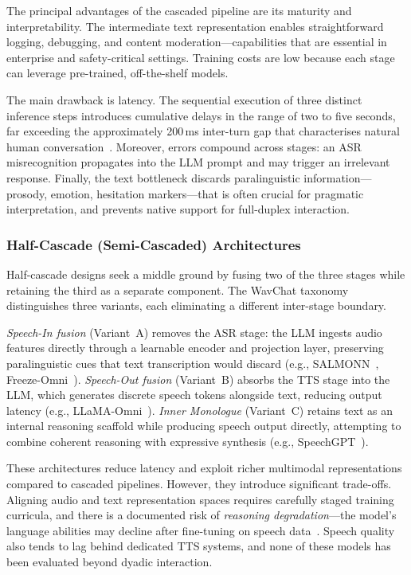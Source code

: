 The principal advantages of the cascaded pipeline are its maturity and
interpretability.  The intermediate text representation enables straightforward
logging, debugging, and content moderation---capabilities that are essential in
enterprise and safety-critical settings.  Training costs are low because each
stage can leverage pre-trained, off-the-shelf models.

The main drawback is latency.  The sequential execution of three distinct
inference steps introduces cumulative delays in the range of two to five
seconds, far exceeding the approximately 200\,ms inter-turn gap that
characterises natural human conversation~\cite{heldner2010pauses}.  Moreover,
errors compound across stages: an ASR misrecognition propagates into the LLM
prompt and may trigger an irrelevant response.  Finally, the text bottleneck
discards paralinguistic information---prosody, emotion, hesitation
markers---that is often crucial for pragmatic interpretation, and prevents
native support for full-duplex interaction.

\subsubsection{Half-Cascade (Semi-Cascaded) Architectures}
\label{sssec:half-cascade}

Half-cascade designs seek a middle ground by fusing two of the three stages
while retaining the third as a separate component.  The WavChat
taxonomy~\cite{ji2024wavechat} distinguishes three variants, each eliminating
a different inter-stage boundary.

\emph{Speech-In fusion} (Variant~A) removes the ASR stage: the LLM ingests
audio features directly through a learnable encoder and projection layer,
preserving paralinguistic cues that text transcription would discard (e.g.,
SALMONN~\cite{tang2024salmonn}, Freeze-Omni~\cite{wang2024freezeomni}).
\emph{Speech-Out fusion} (Variant~B) absorbs the TTS stage into the LLM,
which generates discrete speech tokens alongside text, reducing output latency
(e.g., LLaMA-Omni~\cite{fang2024llamaomni}).  \emph{Inner Monologue}
(Variant~C) retains text as an internal reasoning scaffold while producing
speech output directly, attempting to combine coherent reasoning with
expressive synthesis (e.g., SpeechGPT~\cite{zhang2023speechgpt}).

These architectures reduce latency and exploit richer multimodal
representations compared to cascaded pipelines.  However, they introduce
significant trade-offs.  Aligning audio and text representation spaces
requires carefully staged training curricula, and there is a documented risk
of \emph{reasoning degradation}---the model's language abilities may decline
after fine-tuning on speech data~\cite{chen2025urobench}.  Speech quality
also tends to lag behind dedicated TTS systems, and none of these models has
been evaluated beyond dyadic interaction.


